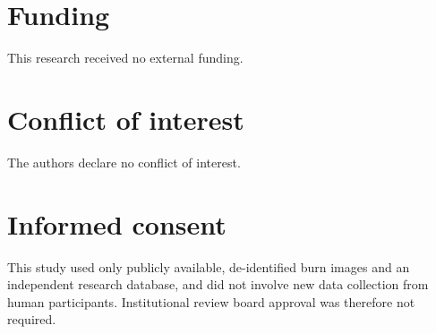 \documentclass{elektr}
\begin{document}
\section*{Funding}
This research received no external funding.

\section*{Conflict of interest}
The authors declare no conflict of interest.

\section*{Informed consent}
This study used only publicly available, de-identified burn images and an independent research database, and did not involve new data collection from human participants. Institutional review board approval was therefore not required.
\end{document}
